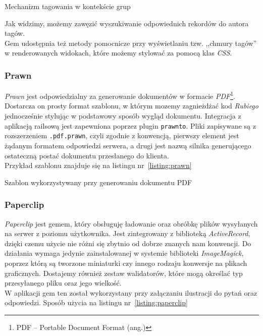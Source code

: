 \documentclass[a4paper,12pt]{article}
\begin{document}
\begin{listing}
  
  \caption{Mechanizm tagowania w kontekście grup}
  \label{listing:tagging_users}
\end{listing}


Jak widzimy, możemy zawęzić wyszukiwanie odpowiednich rekordów do autora tagów.\\
Gem udostępnia też metody pomocnicze przy wyświetlaniu tzw. ,,chmury tagów'' w
renderowanych widokach, które możemy stylować za pomocą klas \emph{CSS}.

\subsubsection{Prawn}
\emph{Prawn} jest odpowiedzialny za generowanie dokumentów w formacie
\emph{PDF}\footnote{PDF -- Portable Document Format (ang.)}. Dostarcza on prosty format
szablonu, w którym mozemy zagnieżdżać kod \emph{Rubiego} jednocześnie stylując
w podstawowy sposób wygląd dokumentu. Integracja z aplikacją railsową jest zapewniona
poprzez plugin \texttt{prawnto}. Pliki zapisywane są z rozszerzeniem \texttt{.pdf.prawn},
czyli zgodnie z konwencją, pierwszy element jest żądanym formatem odpowiedzi serwera,
a drugi jest nazwą silnika generującego ostateczną postać dokumentu przesłanego do klienta.\\
Przykład szablonu znajduje się na listingu nr~\ref{listing:prawn}

\begin{listing}
  
  \caption{Szablon wykorzystywany przy generowaniu dokumentu PDF}
  \label{listing:prawn}
\end{listing}

\subsubsection{Paperclip}
\emph{Paperclip} jest gemem, który obsługuję ładowanie oraz obróbkę plików wysyłanych na
serwer z poziomu użytkownika. Jest zintegrowany z biblioteką \emph{ActiveRecord}, dzięki
czemu użycie nie różni się zbytnio od dobrze znanych nam konwencji. Do działania wymaga
jedynie zainstalowanej w systemie biblioteki \emph{ImageMagick}, poprzez którą są tworzone
miniaturki czy innego rodzaju konwersje na plikach graficznych. Dostajemy również zestaw
walidatorów, które mogą określać typ przesyłanego pliku oraz jego wielkość.\\
W aplikacji gem ten został wykorzystany przy załączaniu ilustracji do pytań oraz odpowiedzi.
Sposób użycia na listingu nr~\ref{listing:paperclip}
\end{document}
